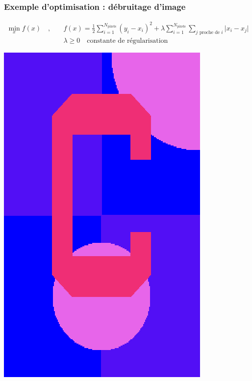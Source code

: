 \documentclass[12pt]{beamer}
\begin{document}
\begin{frame}
\frametitle{Exemple d'optimisation : débruitage d'image}
\vspace{-0.5cm}
\begin{equation*}
\begin{split}
\min_x f(x) \quad,\quad & f(x) = \frac{1}{2}\sum_{i=1}^{N_{\text{pixels}}} (y_i - x_i)^2 + 
\lambda \sum_{i=1}^{N_{\text{pixels}}} \sum_{j \text{ proche de } i} \lvert x_i - x_j \rvert \\
& \lambda \ge 0 \quad\text{constante de régularisation}
\end{split}
\end{equation*}
\begin{center}
\begin{minipage}[t]{0.2\textwidth}
\includegraphics[width=\textwidth]{c_clean.png} \\

\end{minipage}
\end{center}
\end{frame}
\end{document}
